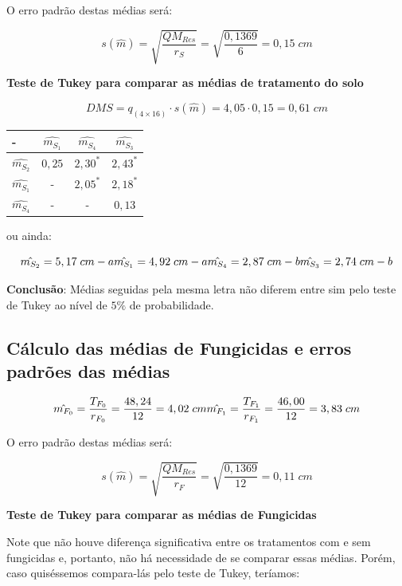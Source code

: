 \documentclass[
]{article}
\begin{document}
O erro padrão destas médias será:

\[
s(\hat{m})=\sqrt{\frac{QM_{Res}}{r_S}}=\sqrt{\frac{0,1369}{6}} = 0,15\;cm
\]

\textbf{Teste de Tukey para comparar as médias de tratamento do solo}

\[
DMS=q_{(4\times16)}\cdot s(\hat{m})=4,05 \cdot 0,15 = 0,61\; cm
\]

\begin{longtable}[]{@{}lccc@{}}
\toprule\noalign{}
- & \(\hat{m_{S_1}}\) & \(\hat{m_{S_4}}\) & \(\hat{m_{S_3}}\) \\
\midrule\noalign{}
\endhead
\bottomrule\noalign{}
\endlastfoot
\(\hat{m_{S_2}}\) & \(0,25\) & \(2,30^*\) & \(2,43^*\) \\
\(\hat{m_{S_1}}\) & - & \(2,05^*\) & \(2,18^*\) \\
\(\hat{m_{S_4}}\) & - & - & \(0,13\) \\
\end{longtable}

ou ainda:

\[
\hat{m_{S_2}} = 5,17\;cm -a\\
\hat{m_{S_1}} = 4,92\;cm -a\\
\hat{m_{S_4}} = 2,87\;cm -b\\
\hat{m_{S_3}} = 2,74\;cm -b\\
\]

\textbf{Conclusão}: Médias seguidas pela mesma letra não diferem entre
sim pelo teste de Tukey ao nível de \(5\%\) de probabilidade.

\subsection{Cálculo das médias de Fungicidas e erros padrões das
médias}\label{cuxe1lculo-das-muxe9dias-de-fungicidas-e-erros-padruxf5es-das-muxe9dias}

\[
\hat{m_{F_0}} = \frac{T_{F_0}}{r_{F_0}}=\frac{48,24}{12}=4,02\;cm \\
\hat{m_{F_1}} = \frac{T_{F_1}}{r_{F_1}}=\frac{46,00}{12}=3,83\;cm 
\]

O erro padrão destas médias será:

\[
s(\hat{m})=\sqrt{\frac{QM_{Res}}{r_F}}=\sqrt{\frac{0,1369}{12}} = 0,11\;cm
\]

\textbf{Teste de Tukey para comparar as médias de Fungicidas}

Note que não houve diferença significativa entre os tratamentos com e
sem fungicidas e, portanto, não há necessidade de se comparar essas
médias. Porém, caso quiséssemos compara-lás pelo teste de Tukey,
teríamos:
\end{document}
